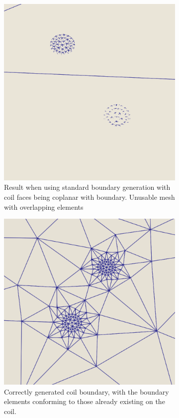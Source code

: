 \documentclass[12pt, letterpaper]{article}
\begin{document}
\begin{figure}
	\begin{subfigure}{0.48\textwidth}
		\includegraphics[width=\linewidth]{coplanarOverlap.png}
		\caption{Result when using standard boundary generation with coil faces being coplanar with boundary. Unusable mesh with overlapping elements}
	\end{subfigure}
	\hspace*{\fill}	
	\begin{subfigure}{0.48\textwidth}
		\includegraphics[width=\linewidth]{coplanarFixed.png}
		\caption{Correctly generated coil boundary, with the boundary elements conforming to those already existing on the coil.}
	\end{subfigure}	
	\caption{}
	\label{coilBoundaryFix}
\end{figure}
\end{document}
